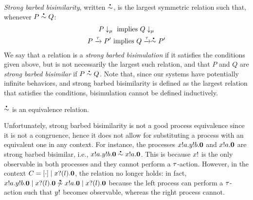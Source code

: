 \documentclass[runningheads]{llncs}
\begin{document}
\emph{Strong barbed bisimilarity}, written \( \sbbisim{}{} \), is the largest symmetric relation such that, whenever \( \sbbisim{P}{Q} \):
\begin{gather*}
  \observable{P}{\mu}~\textrm{implies}~\observable{Q}{\mu} \\%
  \transition{P}{\Atau}{P'}~\textrm{implies}~\transition{Q}{\Atau}{\sbbisim{}{} P'} %
\end{gather*}
We say that a relation is a \emph{strong barbed bisimulation} if it satisfies the conditions given above, but is not necessarily the largest such relation, and that \( P \) and \( Q \) are \emph{strong barbed bisimilar} if \( \sbbisim{P}{Q} \).
Note that, since our systems have potentially infinite behaviors, and strong barbed bisimilarity is defined as the largest relation that satisfies the conditions, bisimulation cannot be defined inductively.

\begin{theorem}
  \( \sbbisim{}{} \) is an equivalence relation. %
\end{theorem}

Unfortunately, strong barbed bisimilarity is not a good process
equivalence since it is not a congruence, hence it does not allow for
substituting a process with an equivalent one in any context.
For instance, the processes $x ! a . y ! b . \bm{0}$ and
$x ! a . \bm{0}$ are strong barbed bisimilar, i.e.,
$\sbbisim{\Pout{x}{a}{\Pout{y}{b}{\Pend}}}{\Pout{x}{a}{\Pend}}$. This
is because \( x! \) is the only observable in both processes
and they cannot perform a \( \tau \)-action. However, in the context
$C = [\cdot] \mid x ? (l) . \bm{0}$, the relation no
longer holds: in fact,
$\nsbbisim{\Ppar{\Pout{x}{a}{\Pout{y}{b}{\Pend}}}{\Pin{x}{l}{\Pend}}}{\Pout{x}{a}{\Pend}\Ppar{}{\Pin{x}{l}{\Pend}}}$
%
because the left process can perform a \( \tau \)-action such that
\( y! \) becomes observable, whereas the right process cannot.

\end{document}
